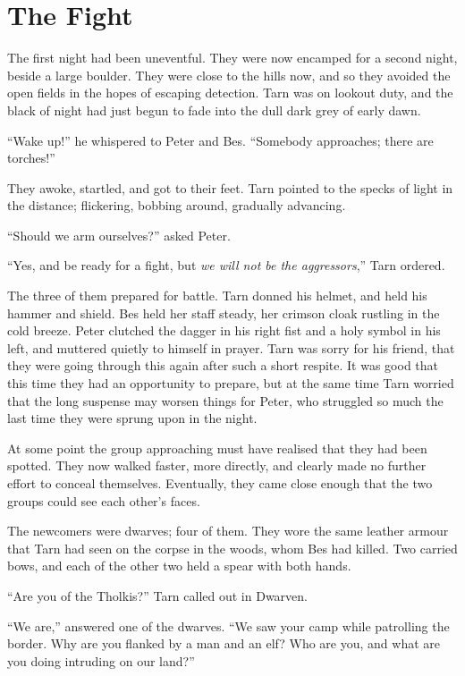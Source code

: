 \chapter{The Fight}

The first night had been uneventful.  They were now encamped for a second night, beside a large boulder.  They were close to the hills now, and so they avoided the open fields in the hopes of escaping detection.  Tarn was on lookout duty, and the black of night had just begun to fade into the dull dark grey of early dawn.

``Wake up!'' he whispered to Peter and Bes.  ``Somebody app\-roa\-ches; there are torches!''

They awoke, startled, and got to their feet.  Tarn pointed to the specks of light in the distance; flickering, bobbing around, gradually advancing.

``Should we arm ourselves?'' asked Peter.

``Yes, and be ready for a fight, but \emph{we will not be the aggressors},'' Tarn ordered.

The three of them prepared for battle.  Tarn donned his helmet, and held his hammer and shield.  Bes held her staff steady, her crimson cloak rustling in the cold breeze.  Peter clutched the dagger in his right fist and a holy symbol in his left, and muttered quietly to himself in prayer.  Tarn was sorry for his friend, that they were going through this again after such a short respite.  It was good that this time they had an opportunity to prepare, but at the same time Tarn worried that the long suspense may worsen things for Peter, who struggled so much the last time they were sprung upon in the night.

At some point the group approaching must have realised that they had been spotted.  They now walked faster, more directly, and clearly made no further effort to conceal themselves.  Eventually, they came close enough that the two groups could see each other's faces.

The newcomers were dwarves; four of them.  They wore the same leather armour that Tarn had seen on the corpse in the woods, whom Bes had killed.  Two carried bows, and each of the other two held a spear with both hands.

``Are you of the Tholkis?'' Tarn called out in Dwarven.

``We are,'' answered one of the dwarves.  ``We saw your camp while patrolling the border.  Why are you flanked by a man and an elf?  Who are you, and what are you doing intruding on our land?''

